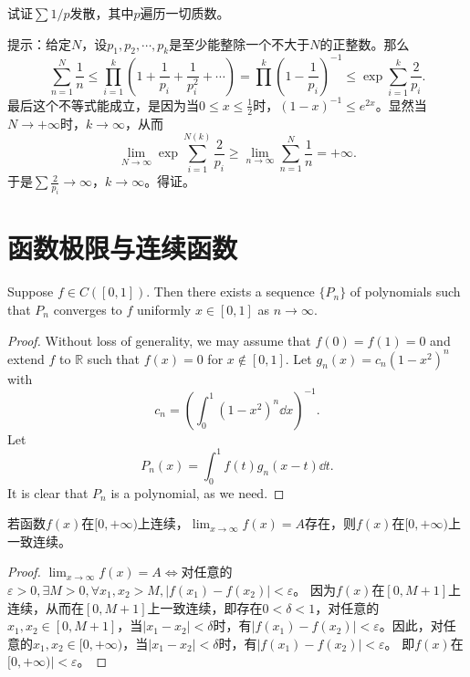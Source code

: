 \begin{example}
试证$\sum1/p$发散，其中$p$遍历一切质数。

提示：给定$N$，设$p_1,p_2,\cdots,p_k$是至少能整除一个不大于$N$的正整数。那么$$\sum_{n=1}^N\frac{1}{n}\leq\prod_{i=1}^k(1+\frac{1}{p_i}+\frac{1}{p_i^2}+\cdots)=\prod^k(1-\frac{1}{p_i})^{-1}\leq\exp\sum_{i=1}^k\frac{2}{p_i}.$$
最后这个不等式能成立，是因为当$0\leq x\leq \frac{1}{2}$时，$(1-x)^{-1}\leq e^{2x}$。显然当$N\rightarrow+\infty$时，$k\to\infty$，从而
$$\lim_{N\to\infty}\exp\sum_{i=1}^{N(k)}\frac{2}{p_i}\geq\lim_{n\to\infty}\sum_{n=1}^N\frac{1}{n}=+\infty.$$
于是$\sum\frac{2}{p_i}\to\infty$，$k\to\infty$。得证。
\end{example}

\section{函数极限与连续函数}

\begin{theorem}
  Suppose $f\in C([0,1])$. Then there exists a sequence $\{P_n\}$ of polynomials such that 
  $P_n$ converges to $f$ uniformly $x\in[0,1]$ as $n\to\infty$.  
\end{theorem}

\begin{proof}
  Without loss of generality, we may assume that $f(0) = f(1) = 0$ and extend $f$ to $\mathbb{R}$ such that 
  $f(x)=0$ for $x\not\in[0,1]$.
  Let $g_n(x) = c_n(1-x^2)^n$ with 
  \[
  c_n = \left(\int_0^1(1-x^2)^n\dd x\right)^{-1}.
  \]
  Let 
  \[
  P_n(x) = \int_0^1f(t)g_n(x-t)\dd t.
  \]
  It is clear that $P_n$ is a polynomial, as we need.
\end{proof}

 \begin{example}
  若函数$f(x)$在$[0,+\infty)$上连续，$\displaystyle\lim_{x\rightarrow\infty}f(x)=A$存在，则$f(x)$在$[0,+\infty)$上一致连续。%
 \end{example}

 \begin{proof}
  $\lim_{x\rightarrow\infty}f(x)=A\Leftrightarrow$对任意的$\varepsilon>0,\exists M>0,\forall x_1,x_2>M,|f(x_1)-f(x_2)|<\varepsilon$。
  因为$f(x)$在$[0,M+1]$上连续，从而在$[0,M+1]$上一致连续，即存在$0<\delta<1$，对任意的$x_1,x_2\in[0,M+1]$，当$|x_1-x_2|<\delta$时，有$|f(x_1)-f(x_2)|<\varepsilon$。因此，对任意的$x_1,x_2\in[0,+\infty)$，当$|x_1-x_2|<\delta$时，有$|f(x_1)-f(x_2)|<\varepsilon$。
  即$f(x)$在$[0,+\infty)|<\varepsilon$。
  \end{proof}


